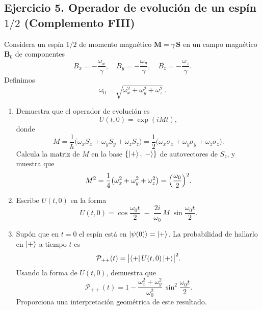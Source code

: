 \documentclass[a4paper,11pt]{article}
\begin{document}
\subsection*{Ejercicio 5. Operador de evolución de un espín \(1/2\) (Complemento FIII)}

Considera un espín \(1/2\) de momento magnético \(\mathbf{M}=\gamma\,\mathbf{S}\) en un campo magnético
\(\mathbf{B}_0\) de componentes
\[
B_x=-\frac{\omega_x}{\gamma},\quad
B_y=-\frac{\omega_y}{\gamma},\quad
B_z=-\frac{\omega_z}{\gamma}.
\]
Definimos 
\[
\omega_0=\sqrt{\omega_x^2+\omega_y^2+\omega_z^2}\,.
\]

\begin{enumerate}
\item Demuestra que el operador de evolución es
\[
U(t,0)=\exp(i M t),
\]
donde
\[
M=\frac{1}{\hbar}\bigl(\omega_x S_x+\omega_y S_y+\omega_z S_z\bigr)
=\frac12\bigl(\omega_x\sigma_x+\omega_y\sigma_y+\omega_z\sigma_z\bigr).
\]
Calcula la matriz de \(M\) en la base \(\{\ket{+},\ket{-}\}\) de autovectores de \(S_z\), y muestra que
\[
M^2=\frac14\bigl(\omega_x^2+\omega_y^2+\omega_z^2\bigr)
=\Bigl(\frac{\omega_0}{2}\Bigr)^2.
\]

\item Escribe \(U(t,0)\) en la forma
\[
U(t,0)=\cos\!\frac{\omega_0t}{2}
\;-\;\frac{2i}{\omega_0}\,M\;\sin\!\frac{\omega_0t}{2}.
\]

\item Supón que en \(t=0\) el espín está en \(\ket{\psi(0)}=\ket{+}\).  
La probabilidad de hallarlo en \(\ket{+}\) a tiempo \(t\) es
\[
\mathcal{P}_{++}(t)=\bigl|\bra{+}U(t,0)\ket{+}\bigr|^2.
\]
Usando la forma de \(U(t,0)\), demuestra que
\[
\mathcal{P}_{++}(t)
=1-\frac{\omega_x^2+\omega_y^2}{\omega_0^2}\,
\sin^2\!\frac{\omega_0 t}{2}.
\]
Proporciona una interpretación geométrica de este resultado.
\end{enumerate}
\end{document}
